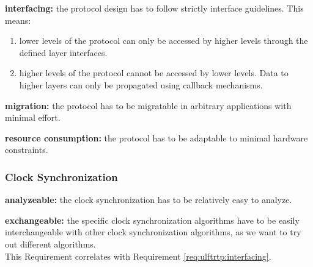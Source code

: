 \begin{req}
\label{req:ulftrtp:interfacing}
\textbf{interfacing: }the protocol design has to follow strictly interface guidelines. This means:
\begin{enumerate}
 \item lower levels of the protocol can only be accessed by higher levels through the defined layer interfaces.
 \item higher levels of the protocol cannot be accessed by lower levels. Data to higher layers can only be propagated using callback mechanisms. 
\end{enumerate}

\end{req}

\begin{req}
\label{req:ulftrtp:easy migration}
\textbf{migration: }the protocol has to be migratable in arbitrary applications with minimal effort.
\end{req}

\begin{req}
\label{req:ulftrtp:resource consumption}
\textbf{resource consumption: }the protocol has to be adaptable to minimal hardware constraints.
\end{req}


\subsubsection{Clock Synchronization}
\begin{req}
\label{req:clock:analyzeable}
\textbf{analyzeable: }the clock synchronization has to be relatively easy to analyze.
\end{req}

\begin{req}
\label{req:clock:exchangeable}
\textbf{exchangeable: }the specific clock synchronization algorithms have to be easily interchangeable with other clock synchronization algorithms, as we want to try out different algorithms.\\
This Requirement correlates with Requirement \ref{req:ulftrtp:interfacing}.
\end{req}
